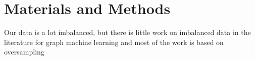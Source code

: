 \chapter[Materials and Methods]{Materials and Methods}
\label{Materials}

Our data is a lot imbalanced, but there is little work on imbalanced data in the literature for graph machine learning and most of the work is based on oversampling %



% 

% 





